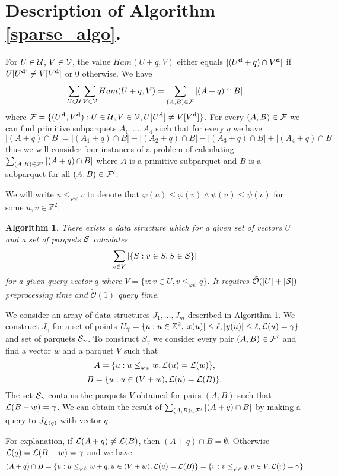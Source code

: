 \documentclass[a4paper]{article}
\newcommand{\Z}{\mathbb{Z}}
\newcommand{\tO}{\tilde{\mathcal{O}}}
\renewcommand{\phi}{\varphi}
\newcommand{\set}[1]{\lbrace #1 \rbrace}
\newtheorem{algorithm}{Algorithm}
\begin{document}
\section{Description of Algorithm \ref{sparse_algo}.}


For $U \in \U$, $V \in \V$, the value $Ham(U + q, V)$ either equals $|(\d{U} + q) \cap \d{V}|$ if $U[\d{U}] \neq V[\d{V}]$ or $0$ otherwise.
We have
$$ \sum_{U \in \U} \sum_{V \in \V} Ham(U + q, V) = \sum_{(A, B) \in \F} |(A + q) \cap B| $$
where $ \F = \set{(\d{U}, \d{V}) : U \in \U, V \in \V, U[\d{U}] \neq V[\d{V}]} $. 
For every $(A, B) \in \F$ we can find primitive subparquets $A_1, \dots, A_4$ such that for every $q$ we have
$$ |(A + q) \cap B| = |(A_1 + q) \cap B| - |(A_2 + q) \cap B| - |(A_3 + q) \cap B| + |(A_4 + q) \cap B| $$
thus we will consider four instances of a problem of calculating $\sum_{(A, B) \in \F'} |(A + q) \cap B|$ where $A$ is a primitive subparquet and $B$ is a subparquet for all $(A, B) \in \F'$.

We will write $u \le_{\phi\psi} v$ to denote that $\phi(u) \le \phi(v) \wedge \psi(u) \le \psi(v)$ for some $u, v \in \Z^2$.


\begin{algorithm}
	\label{sweeper}
	There exists a data structure which for a given set of vectors $U$ and a set of parquets $\S$ calculates
	$$ \sum_{v \in V} |\set{S : v \in S, S \in \S}| $$
	for a given query vector $q$ where $V = \set{v : v \in U, v \le_{\phi\psi} q}$.
	It requires $\tO(|U| + |\S|)$ preprocessing time and $\tO(1)$ query time.
\end{algorithm}


We consider an array of data structures $J_1, \dots, J_m$ described in Algorithm \ref{sweeper}.
We construct $J_\gamma$ for a set of points $U_\gamma = \set{u : u \in \Z^2, |x(u)| \le \ell, |y(u)| \le \ell, \L(u) = \gamma}$ and set of parquets $\S_\gamma$.
To construct $S_\gamma$ we consider every pair $(A, B) \in \F'$ and find a vector $w$ and a parquet $V$ such that 
$$ A = \set{u : u \le_{\phi\psi} w, \L(u) = \L(w)},$$
$$ B = \set{u : u \in (V + w), \L(u) = \L(B)}.$$
The set $\S_\gamma$ contains the parquets $V$ obtained for pairs $(A, B)$ such that $\L(B - w) = \gamma$.
We can obtain the result of $\sum_{(A, B) \in \F'} |(A + q) \cap B|$ by making a query to $J_{\L(q)}$ with vector $q$.

For explanation, if $\L(A + q) \neq \L(B)$, then $(A + q) \cap B = \emptyset$.
Otherwise $\L(q) = \L(B - w) = \gamma$ and we have
$$ (A + q) \cap B = \set{u : u \le_{\phi\psi} w + q, u \in (V + w), \L(u) = \L(B)} = \set{v : v \le_{\phi\psi} q, v \in V, \L(v) = \gamma} $$
\end{document}
